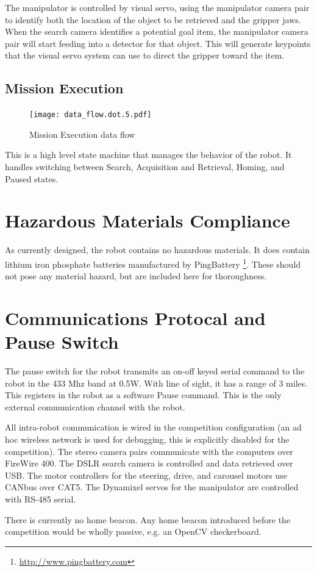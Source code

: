 \documentclass[12pt]{article}
\begin{document}
The manipulator is controlled by visual servo, using the manipulator camera pair to identify both the location of the object to be retrieved and the gripper jaws. When the search camera identifies a potential goal item, the manipulator camera pair will start feeding into a detector for that object. This will generate keypoints that the visual servo system can use to direct the gripper toward the item.


\subsection{Mission Execution}\label{MissionExecution}
\begin{figure}[htbp]
\centering
\texttt{[image: data\_flow.dot.5.pdf]}
\caption{Mission Execution data flow}
\label{fig_df_exec}
\end{figure}

This is a high level state machine that manages the behavior of the robot. It handles switching between Search, Acquisition and Retrieval, Homing, and Paused states.


\section{Hazardous Materials Compliance}\label{Hazardous}
As currently designed, the robot contains no hazardous materials. It does contain lithium iron phosphate batteries manufactured by PingBattery \footnote{\url{http://www.pingbattery.com}}. These should not pose any material hazard, but are included here for thoroughness.

\section{Communications Protocal and Pause Switch}\label{Comms}
The pause switch for the robot transmits an on-off keyed serial command to the robot in the 433 Mhz band at 0.5W. With line of sight, it has a range of 3 miles. This registers in the robot as a software Pause command. This is the only external communication channel with the robot.

All intra-robot communication is wired in the competition configuration (an ad hoc wireless network is used for debugging, this is explicitly disabled for the competition). The stereo camera pairs communicate with the computers over FireWire 400. The DSLR search camera is controlled and data retrieved over USB. The motor controllers for the steering, drive, and carousel motors use CANbus over CAT5. The Dynamixel servos for the manipulator are controlled with RS-485 serial.

There is currently no home beacon. Any home beacon introduced before the competition would be wholly passive, e.g. an OpenCV checkerboard.



\end{document}
